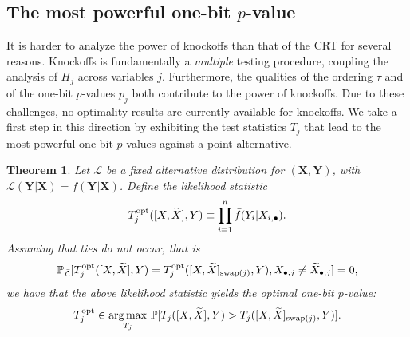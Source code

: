 \documentclass[12pt]{article}
\newtheorem{theorem}{Theorem}
\theoremstyle{definition}
\theoremstyle{remark}
\newcommand{\prx}{\bm X}
\newcommand{\srx}{X}
\newcommand{\srxk}{\widetilde X}
\newcommand{\pry}{{\bm Y}}
\newcommand{\sry}{Y}
\begin{document}
\subsection{The most powerful one-bit $p$-value}

It is harder to analyze the power of knockoffs than that of the CRT for several reasons. Knockoffs is fundamentally a \textit{multiple} testing procedure, coupling the analysis of $H_j$ across variables $j$. Furthermore, the qualities of the ordering $\tau$ and of the one-bit $p$-values $p_j$ both contribute to the power of knockoffs. Due to these challenges, no optimality results are currently available for knockoffs. We take a first step in this direction by exhibiting the test statistics $T_j$ that lead to the most powerful one-bit $p$-values against a point alternative. 

\begin{theorem} \label{prop:knockoff-optimality}
	Let $\bar{\mathcal L}$ be a fixed alternative distribution for $(\prx,\pry)$, with $\bar{\mathcal L}(\pry|\prx) = \bar f(\pry|\prx)$. Define the likelihood statistic
	\begin{equation}
	T_j^{\textnormal{opt}}([\srx, \srxk], \sry) \equiv \prod_{i = 1}^n\bar f(\sry_i|\srx_{i,\bullet}).
	\label{log-likelihood-ratio-knockoffs}
	\end{equation}
	Assuming that ties do not occur, that is
	\begin{equation}
	\mathbb P_{\bar {\mathcal L}}[T^{\textnormal{opt}}_j([\srx, \srxk], \sry) = T^{\textnormal{opt}}_j([\srx, \srxk]_{\textnormal{swap}(j)}, \sry), \srx_{\bullet, j} \neq \srxk_{\bullet, j}] = 0, 
	\label{nondegeneracy-assumption}
	\end{equation}
	we have that the above likelihood statistic yields the optimal one-bit $p$-value:
	\begin{equation}
	T_j^{\textnormal{opt}} \in \underset{T_j}{\arg \max}\ \mathbb P[T_j([\srx, \srxk], \sry) > T_j([\srx, \srxk]_{\textnormal{swap}(j)}, \sry)].
	\label{unconditional-knockoff-optimality}
	\end{equation}
\end{theorem}
\end{document}
